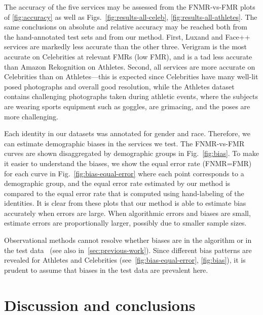 \documentclass[10pt,twocolumn,letterpaper]{article}
\begin{document}
The accuracy of the five services may be assessed from the FNMR-vs-FMR plots of \cref{fig:accuracy} as well as Figs.~\ref{fig:results-all-celeb}, \ref{fig:results-all-athletes}. The same conclusions on absolute and relative accuracy may be reached both from the hand-annotated test sets and from our method.  First, Luxand and Face++ services are markedly less accurate than the other three. Verigram is the most accurate on Celebrities at relevant FMRs (low FMR), and is a tad less accurate than Amazon Rekognition on Athletes. Second, all services are more accurate on Celebrities than on Athletes---this is expected since Celebrities have many well-lit posed photographs and overall good resolution, while the Athletes dataset contains challenging photographs taken during athletic events, where the subjects are wearing sports equipment such as goggles, are grimacing, and the poses are more challenging.

Each identity in our datasets was annotated for gender and race. Therefore, we can estimate demographic biases in the services we test. The FNMR-vs-FMR curves are shown disaggregated by demographic groups in Fig.~\ref{fig:bias}. To make it easier to understand the biases, we show the equal error rate (FNMR=FMR) for each curve in Fig.~\ref{fig:bias-equal-error} where each point corresponds to a demographic group, and the equal error rate estimated by our method is compared to the equal error rate that is computed using hand-labeling of the identities. It is clear from these plots that our method is able to estimate bias accurately when errors are large. When algorithmic errors and biases are small, estimate errors are proportionally larger, possibly due to smaller sample sizes.

Observational methods cannot resolve whether biases are in the algorithm or in the test data~\cite{balakrishnan2021towards} (see also in~\cref{sec:previous-work}). Since different bias patterns are revealed for Athletes and Celebrities (see~\cref{fig:bias-equal-error}, \cref{fig:bias}), it is prudent to assume that biases in the test data are prevalent here. 

\section{Discussion and conclusions}
\label{sec:conclusions}
\label{sec:discussion}
\end{document}
